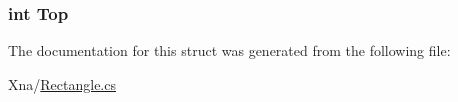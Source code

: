 \subsubsection[{Top}]{\setlength{\rightskip}{0pt plus 5cm}int Top\hspace{0.3cm}{\ttfamily [get]}}\label{structMicrosoft_1_1Xna_1_1Framework_1_1Rectangle_a0ce92b11ec313a08cc69dadd05bd9cd0}


The documentation for this struct was generated from the following file\+:\begin{DoxyCompactItemize}
\item 
Xna/\hyperlink{Rectangle_8cs}{Rectangle.\+cs}\end{DoxyCompactItemize}
